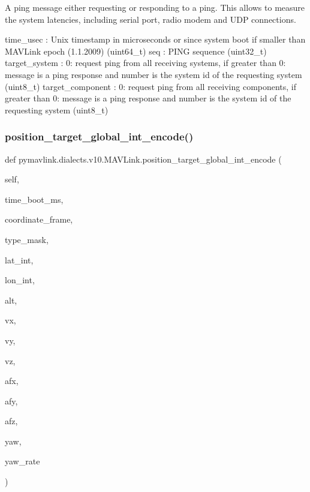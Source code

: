 \begin{DoxyVerb}
\begin{DoxyVerb}
\begin{DoxyVerb}
\begin{DoxyVerb}
\begin{DoxyVerb}A ping message either requesting or responding to a ping. This allows
to measure the system latencies, including serial
port, radio modem and UDP connections.

time_usec                 : Unix timestamp in microseconds or since system boot if smaller than MAVLink epoch (1.1.2009) (uint64_t)
seq                       : PING sequence (uint32_t)
target_system             : 0: request ping from all receiving systems, if greater than 0: message is a ping response and number is the system id of the requesting system (uint8_t)
target_component          : 0: request ping from all receiving components, if greater than 0: message is a ping response and number is the system id of the requesting system (uint8_t)\end{DoxyVerb}
 \mbox{\label{classpymavlink_1_1dialects_1_1v10_1_1MAVLink_ae968d9a925712082d26345007ac36735}} 
\subsubsection{\texorpdfstring{position\+\_\+target\+\_\+global\+\_\+int\+\_\+encode()}{position\_target\_global\_int\_encode()}}
{\footnotesize\ttfamily def pymavlink.\+dialects.\+v10.\+M\+A\+V\+Link.\+position\+\_\+target\+\_\+global\+\_\+int\+\_\+encode (\begin{DoxyParamCaption}\item[{}]{self,  }\item[{}]{time\+\_\+boot\+\_\+ms,  }\item[{}]{coordinate\+\_\+frame,  }\item[{}]{type\+\_\+mask,  }\item[{}]{lat\+\_\+int,  }\item[{}]{lon\+\_\+int,  }\item[{}]{alt,  }\item[{}]{vx,  }\item[{}]{vy,  }\item[{}]{vz,  }\item[{}]{afx,  }\item[{}]{afy,  }\item[{}]{afz,  }\item[{}]{yaw,  }\item[{}]{yaw\+\_\+rate }\end{DoxyParamCaption})}


\end{DoxyVerb}
\end{DoxyVerb}
\end{DoxyVerb}
\end{DoxyVerb}
